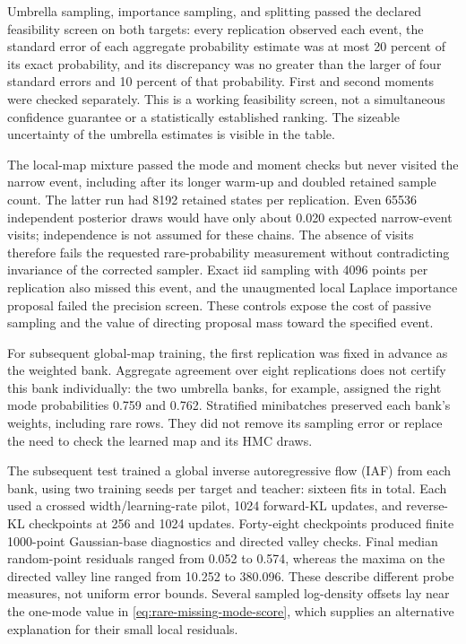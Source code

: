 Umbrella sampling, importance sampling, and splitting passed the declared
feasibility screen on both targets: every replication observed each event,
the standard error of each aggregate probability estimate was at most
20 percent of its exact probability, and its discrepancy was no greater than
the larger of four standard errors and 10 percent of that probability.
First and second moments were checked separately. This is a working
feasibility screen, not a simultaneous confidence guarantee or a statistically
established ranking. The sizeable uncertainty of the umbrella estimates is
visible in the table.

The local-map mixture passed the mode and moment checks but never visited
the narrow event, including after its longer warm-up and doubled retained
sample count. The latter run had 8192 retained states per replication. Even
65536 independent posterior draws would have only about 0.020 expected
narrow-event visits; independence is not assumed for these chains. The
absence of visits therefore fails the requested rare-probability measurement
without contradicting invariance of the corrected sampler. Exact iid
sampling with 4096 points per replication also missed this event, and the
unaugmented local Laplace importance proposal failed the precision screen.
These controls expose the cost of passive sampling and the value of directing
proposal mass toward the specified event.

For subsequent global-map training, the first replication was fixed in
advance as the weighted bank. Aggregate agreement over eight replications
does not certify this bank individually: the two umbrella banks, for example,
assigned the right mode probabilities 0.759 and 0.762. Stratified minibatches
preserved each bank's weights, including rare rows. They did not remove its
sampling error or replace the need to check the learned map and its HMC draws.

The subsequent test trained a global inverse autoregressive flow (IAF) from
each bank, using two training seeds per target and teacher: sixteen fits in
total. Each used a crossed width/learning-rate pilot, 1024 forward-KL updates,
and reverse-KL checkpoints at 256 and 1024 updates. Forty-eight checkpoints
produced finite 1000-point Gaussian-base diagnostics and directed valley
checks. Final median random-point residuals ranged from 0.052 to 0.574,
whereas the maxima on the directed valley line ranged from 10.252 to 380.096.
These describe different probe measures, not uniform error bounds. Several
sampled log-density offsets lay near the one-mode value in
\eqref{eq:rare-missing-mode-score}, which supplies an alternative explanation
for their small local residuals.

